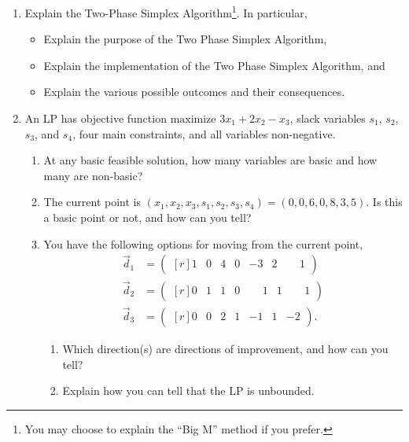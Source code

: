 \begin{enumerate}
\item
  Explain the Two-Phase Simplex Algorithm\footnote{You may choose to explain the ``Big M'' method if
  you prefer.}. In particular, 
\begin{itemize}
  \item    Explain the purpose of the Two Phase Simplex Algorithm,
  \item    Explain the implementation of the Two Phase Simplex Algorithm, and
  \item    Explain the various possible outcomes and their consequences.
\end{itemize}

\item
An LP has objective function \( \text{maximize } 3x_1 + 2 x_2 - x_3 \), slack
variables \(s_1\), \(s_2\), \(s_3\), and \(s_4\), four main constraints, and all variables
non-negative.  

\begin{enumerate}
  \item At any basic feasible solution, how many variables are basic and how many are non-basic?
  \item The current point is $(x_1,x_2,x_3,s_1,s_2,s_3,s_4)=(0,0,6,0,8,3,5)$. Is this a basic point
  or not, and how can you tell?

  \item You have the following options for moving from the current point, 
\begin{align*}
  \Vec{d}_1&=\begin{pmatrix*}[r]1& 0& 4& 0&           -3& 2& \phantom{-}1\end{pmatrix*}\\
  \Vec{d}_2&=\begin{pmatrix*}[r]0& 1& 1& 0& \phantom{-}1& 1& \phantom{-}1\end{pmatrix*}\\
  \Vec{d}_3&=\begin{pmatrix*}[r]0& 0& 2& 1&           -1& 1&           -2\end{pmatrix*}.
\end{align*}
\begin{enumerate}
	\item Which direction(s) are directions of improvement, and how can you tell?
	\item Explain how you can tell that the LP is unbounded.
\end{enumerate}
\end{enumerate}


\end{enumerate}
